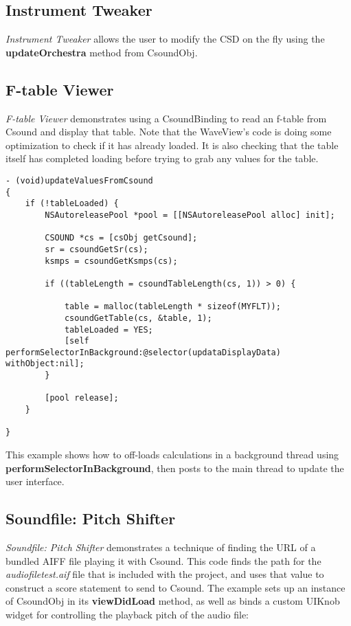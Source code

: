 \documentclass[11pt]{article}
\begin{document}
\subsection{Instrument Tweaker}

\emph{Instrument Tweaker} allows the user to modify the CSD on the fly using the \textbf{updateOrchestra} method from CsoundObj. 

\subsection{F-table Viewer}

\emph{F-table Viewer} demonstrates using a CsoundBinding to read an f-table from Csound and display that table.  Note that the WaveView's code is doing some optimization to check if it has already loaded.  It is also checking that the table itself has completed loading before trying to grab any values for the table.

\begin{lstlisting}[caption=Waveview code demonstrating reading f-tables from Csound]
- (void)updateValuesFromCsound
{
    if (!tableLoaded) {
        NSAutoreleasePool *pool = [[NSAutoreleasePool alloc] init];

        CSOUND *cs = [csObj getCsound];
        sr = csoundGetSr(cs);
        ksmps = csoundGetKsmps(cs);

        if ((tableLength = csoundTableLength(cs, 1)) > 0) {

            table = malloc(tableLength * sizeof(MYFLT));
            csoundGetTable(cs, &table, 1);
            tableLoaded = YES;
            [self performSelectorInBackground:@selector(updataDisplayData) withObject:nil];
        }

        [pool release];
    }

}
\end{lstlisting}

This example shows how to off-loads calculations in a background thread using \textbf{performSelectorInBackground}, then posts to the main thread to update the user interface.

\subsection{Soundfile: Pitch Shifter}

\emph{Soundfile: Pitch Shifter} demonstrates a technique of finding the URL of a bundled AIFF file playing it with Csound.  This code finds the path for the \emph{audiofiletest.aif} file that is included with the project, and uses that value to construct a score statement to send to Csound. The example sets up an instance of CsoundObj in its \textbf{viewDidLoad} method, as well as binds a custom UIKnob widget for controlling the playback pitch of the audio file:
\end{document}

